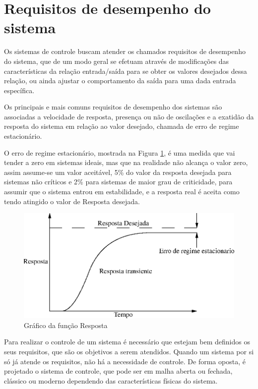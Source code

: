 \section{Requisitos de desempenho do sistema}

Os sistemas de controle buscam atender os chamados requisitos de desempenho do sistema, que de um modo geral se efetuam através de modificações das características da relação entrada/saída para se obter os valores desejados dessa relação, ou ainda ajustar o comportamento da saída para uma dada entrada específica.

Os principais e mais comuns requisitos de desempenho dos sistemas são associadas a velocidade de resposta, presença ou não de oscilações e a exatidão da resposta do sistema em relação ao valor desejado, chamada de erro de regime estacionário.

O erro de regime estacionário, mostrada na Figura \ref{fig:funcaoResposta}, é uma medida que vai tender a zero em sistemas ideais, mas que na realidade não alcança o valor zero, assim assume-se um valor aceitável, 5\% do valor da resposta desejada para sistemas não críticos e 2\% para sistemas de maior grau de criticidade, para assumir que o sistema entrou em estabilidade, e a resposta real é aceita como tendo atingido o valor de Resposta desejada. 

\begin{figure}[!htb]
\center\includegraphics[scale=1]{./pic/C400grafico.eps}
\caption{Gráfico da função Resposta}
\label{fig:funcaoResposta}
\end{figure}

Para realizar o controle de um sistema é necessário que estejam bem definidos os seus requisitos, que são os objetivos a serem atendidos. Quando um sistema por si só já atende os requisitos, não há a necessidade de controle. De forma oposta, é projetado o sistema de controle, que pode ser em malha aberta ou fechada, clássico ou moderno dependendo das características físicas do sistema. 

